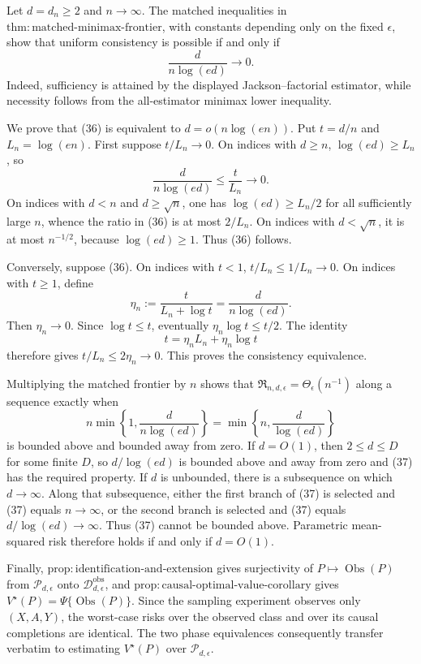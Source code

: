 Let \(d=d_n\geq2\) and \(n\to\infty\).  The matched inequalities in \(\mathrm{thm:matched\text{-}minimax\text{-}frontier}\), with constants depending only on the fixed \(\epsilon\), show that uniform consistency is possible if and only if
\[
 \frac d{n\log(ed)}\longrightarrow0.
 \tag{36}
\]
Indeed, sufficiency is attained by the displayed Jackson--factorial estimator, while necessity follows from the all-estimator minimax lower inequality.

We prove that (36) is equivalent to \(d=o(n\log(en))\).  Put \(t=d/n\) and \(L_n=\log(en)\).  First suppose \(t/L_n\to0\).  On indices with \(d\geq n\), \(\log(ed)\geq L_n\), so
\[
 \frac d{n\log(ed)}\leq\frac t{L_n}\longrightarrow0.
\]
On indices with \(d<n\) and \(d\geq\sqrt n\), one has \(\log(ed)\geq L_n/2\) for all sufficiently large \(n\), whence the ratio in (36) is at most \(2/L_n\).  On indices with \(d<\sqrt n\), it is at most \(n^{-1/2}\), because \(\log(ed)\geq1\).  Thus (36) follows.

Conversely, suppose (36).  On indices with \(t<1\), \(t/L_n\leq1/L_n\to0\).  On indices with \(t\geq1\), define
\[
 \eta_n:=\frac{t}{L_n+\log t}=\frac d{n\log(ed)}.
\]
Then \(\eta_n\to0\).  Since \(\log t\leq t\), eventually \(\eta_n\log t\leq t/2\).  The identity
\[
 t=\eta_nL_n+\eta_n\log t
\]
therefore gives \(t/L_n\leq2\eta_n\to0\).  This proves the consistency equivalence.

Multiplying the matched frontier by \(n\) shows that \(\mathfrak R_{n,d,\epsilon}=\Theta_\epsilon(n^{-1})\) along a sequence exactly when
\[
 n\min\left\{1,\frac d{n\log(ed)}\right\}
 =\min\left\{n,\frac d{\log(ed)}\right\}
 \tag{37}
\]
is bounded above and bounded away from zero.  If \(d=O(1)\), then \(2\leq d\leq D\) for some finite \(D\), so \(d/\log(ed)\) is bounded above and away from zero and (37) has the required property.  If \(d\) is unbounded, there is a subsequence on which \(d\to\infty\).  Along that subsequence, either the first branch of (37) is selected and (37) equals \(n\to\infty\), or the second branch is selected and (37) equals \(d/\log(ed)\to\infty\).  Thus (37) cannot be bounded above.  Parametric mean-squared risk therefore holds if and only if \(d=O(1)\).

Finally, \(\mathrm{prop:identification\text{-}and\text{-}extension}\) gives surjectivity of \(P\mapsto\operatorname{Obs}(P)\) from \(\mathcal P_{d,\epsilon}\) onto \(\mathcal D_{d,\epsilon}^{\mathrm{obs}}\), and \(\mathrm{prop:causal\text{-}optimal\text{-}value\text{-}corollary}\) gives \(V^\star(P)=\Psi\{\operatorname{Obs}(P)\}\).  Since the sampling experiment observes only \((X,A,Y)\), the worst-case risks over the observed class and over its causal completions are identical.  The two phase equivalences consequently transfer verbatim to estimating \(V^\star(P)\) over \(\mathcal P_{d,\epsilon}\).